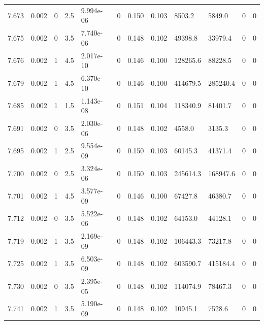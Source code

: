 \documentclass[preview]{standalone}
\begin{document}
{{{{{{{{{{{{{{{{{{\begin{tabular}{L{1.2cm}C{1.2cm} C{0.3cm}C{0.5cm} C{1.4cm}C{1.4cm} C{1.4cm}C{1.4cm} C{1.6cm}C{1.6cm} C{1.6cm}C{1.6cm}}
  7.673  &  0.002  & 0     & 2.5 &  9.994e-06  & 0  &  0.150&   0.103& 8503.2 & 5849.0   &  0 & 0  \\ 
  7.675  &  0.002  & 0     & 3.5 &  7.740e-06  & 0  &  0.148&   0.102& 49398.8 & 33979.4   &  0 & 0  \\ 
  7.676  &  0.002  & 1     & 4.5 &  2.017e-10  & 0  &  0.146&   0.100& 128265.6 & 88228.5   &  0 & 0  \\ 
  7.679  &  0.002  & 1     & 4.5 &  6.370e-10  & 0  &  0.146&   0.100& 414679.5 & 285240.4   &  0 & 0  \\ 
  7.685  &  0.002  & 1     & 1.5 &  1.143e-08  & 0  &  0.151&   0.104& 118340.9 & 81401.7   &  0 & 0  \\ 
  7.691  &  0.002  & 0     & 3.5 &  2.030e-06  & 0  &  0.148&   0.102& 4558.0 & 3135.3   &  0 & 0  \\ 
  7.695  &  0.002  & 1     & 2.5 &  9.554e-09  & 0  &  0.150&   0.103& 60145.3 & 41371.4   &  0 & 0  \\ 
  7.700  &  0.002  & 0     & 2.5 &  3.324e-06  & 0  &  0.150&   0.103& 245614.3 & 168947.6   &  0 & 0  \\ 
  7.701  &  0.002  & 1     & 4.5 &  3.577e-09  & 0  &  0.146&   0.100& 67427.8 & 46380.7   &  0 & 0  \\ 
  7.712  &  0.002  & 0     & 3.5 &  5.522e-06  & 0  &  0.148&   0.102& 64153.0 & 44128.1   &  0 & 0  \\ 
  7.719  &  0.002  & 1     & 3.5 &  2.169e-09  & 0  &  0.148&   0.102& 106443.3 & 73217.8   &  0 & 0  \\ 
  7.725  &  0.002  & 1     & 3.5 &  6.503e-09  & 0  &  0.148&   0.102& 603590.7 & 415184.4   &  0 & 0  \\ 
  7.730  &  0.002  & 0     & 3.5 &  2.395e-05  & 0  &  0.148&   0.102& 114074.9 & 78467.3   &  0 & 0  \\ 
  7.741  &  0.002  & 1     & 3.5 &  5.190e-09  & 0  &  0.148&   0.102& 10945.1 & 7528.6   &  0 & 0  \\ 
\hline 
\end{tabular} 

}}}}}}}}}}}}}}}}}}
\end{document}
